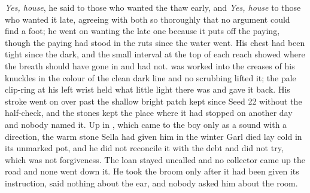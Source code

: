 \emph{Yes, house}, he said to those who wanted the thaw early, and \emph{Yes, house} to those who wanted it late, agreeing with both so thoroughly that no argument could find a foot; he went on wanting the late one because it puts off the paying, though the paying had stood in the ruts since the water went. His chest had been tight since the dark, and the small interval at the top of each reach showed where the breath should have gone in and had not.  was worked into the creases of his knuckles in the colour of the clean dark line and no scrubbing lifted it; the pale clip-ring at his left wrist held what little light there was and gave it back. His stroke went on over  past the shallow bright patch kept since Seed 22 without the half-check, and the stones kept the place where it had stopped on another day and nobody named it. Up in , which came to the boy only as a sound with a direction, the warm stone Sella had given him in the winter Garl died lay cold in its unmarked pot, and he did not reconcile it with the debt and did not try, which was not forgiveness. The loan stayed uncalled and no collector came up the road and none went down it. He took the broom only after it had been given its instruction, said nothing about the ear, and nobody asked him about the room.

